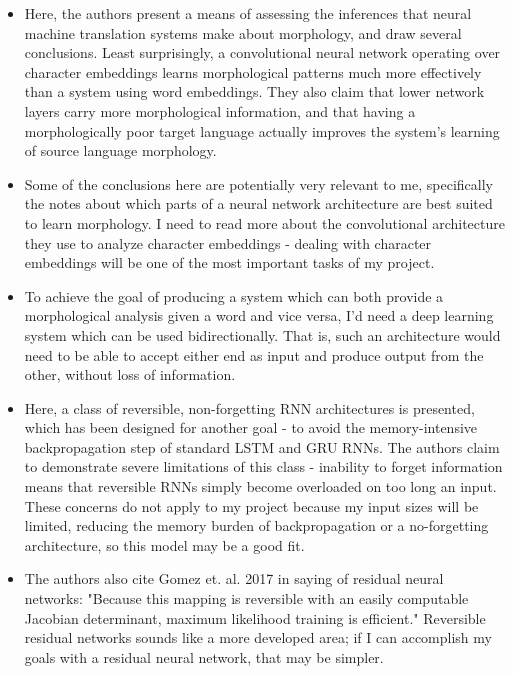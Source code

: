 \documentclass[12pt]{report}
\begin{document}
\begin{itemize}

	\item Here, the authors present a means of assessing the inferences that neural machine translation systems make about morphology, and draw several conclusions. Least surprisingly, a convolutional neural network operating over character embeddings learns morphological patterns much more effectively than a system using word embeddings. They also claim that lower network layers carry more morphological information, and that having a morphologically poor target language actually improves the system's learning of source language morphology.
	
	\item Some of the conclusions here are potentially very relevant to me, specifically the notes about which parts of a neural network architecture are best suited to learn morphology. I need to read more about the convolutional architecture they use to analyze character embeddings - dealing with character embeddings will be one of the most important tasks of my project.

\end{itemize}


\begin{itemize}

	\item To achieve the goal of producing a system which can both provide a morphological analysis given a word and vice versa, I'd need a deep learning system which can be used bidirectionally. That is, such an architecture would need to be able to accept either end as input and produce output from the other, without loss of information. 
	
	\item Here, a class of reversible, non-forgetting RNN architectures is presented, which has been designed for another goal - to avoid the memory-intensive backpropagation step of standard LSTM and GRU RNNs. The authors claim to demonstrate severe limitations of this class - inability to forget information means that reversible RNNs simply become overloaded on too long an input. These concerns do not apply to my project because my input sizes will be limited, reducing the memory burden of backpropagation or a no-forgetting architecture, so this model may be a good fit.
	
	\item The authors also cite Gomez et. al. 2017\cite{Gomez2017} in saying of residual neural networks: "Because this mapping is reversible with an easily computable Jacobian determinant, maximum likelihood training is efficient." Reversible residual networks sounds like a more developed area; if I can accomplish my goals with a residual neural network, that may be simpler.

\end{itemize}
\end{document}
